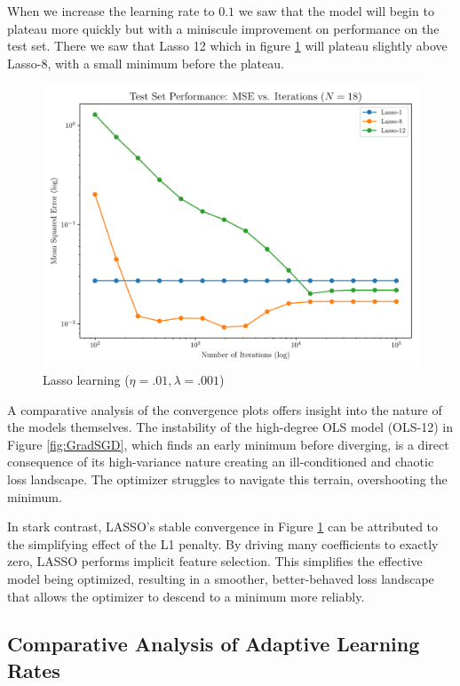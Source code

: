 \documentclass[twocolumn,aps]{revtex4}
\begin{document}
When we increase the learning rate to $0.1$ we saw that the model will begin to plateau more quickly but with a miniscule improvement on performance on the test set. 
There we saw that Lasso 12 which in figure \ref{fig:Lasso1} will plateau slightly above Lasso-8, with a small minimum before the plateau.


\begin{figure}[h]
    \centering
    \includegraphics[width=.95 \linewidth]{Figures/Lasso_MSE.pdf}
    \caption{Lasso learning ($\eta=.01, \lambda=.001$)}
    \label{fig:Lasso1}
\end{figure}

A comparative analysis of the convergence plots offers insight into the nature of the models themselves. The instability of the high-degree OLS model (OLS-12) in Figure \ref{fig:GradSGD}, which finds an early minimum before diverging, is a direct consequence of its high-variance nature creating an ill-conditioned and chaotic loss landscape. 
The optimizer struggles to navigate this terrain, overshooting the minimum.

In stark contrast, LASSO's stable convergence in Figure \ref{fig:Lasso1} can be attributed to the simplifying effect of the L1 penalty. By driving many coefficients to exactly zero, LASSO performs implicit feature selection. 
This simplifies the effective model being optimized, resulting in a smoother, better-behaved loss landscape that allows the optimizer to descend to a minimum more reliably.

\subsection{Comparative Analysis of Adaptive Learning Rates}
\end{document}
